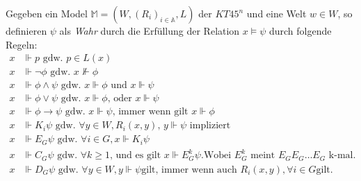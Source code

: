 \begin{definition}
		Gegeben ein Model $\mathds{M} = (W,(R_i)_{i \in \mathds{A}}, L)$ der $KT45^n$ und eine Welt $w \in W$, so definieren $\psi$ als \emph{Wahr} durch die Erfüllung der Relation $x \vDash \psi$ durch folgende Regeln:
		\begin{align}
			x &\Vdash p\text{ gdw. }p \in L(x)\\
			x &\Vdash \neg \phi\text{ gdw. }x \nVdash \phi\\
			x &\Vdash \phi \wedge \psi\text{ gdw. }x \Vdash \phi\text{ und } x \Vdash \psi\\
			x &\Vdash \phi \vee \psi\text{ gdw. }x \Vdash \phi \text{, oder } x \Vdash \psi\\
			x &\Vdash \phi \rightarrow \psi\text{ gdw. }x \Vdash \psi\text{, immer wenn gilt }x \Vdash \phi\\
			x &\Vdash K_i\psi \text{ gdw. } \forall y \in W, R_i(x,y) \text{, } y \Vdash \psi \text{ impliziert}\\
			x &\Vdash E_G\psi \text{ gdw. } \forall i \in G, x \Vdash K_i\psi\\
			x &\Vdash C_G\psi \text{ gdw. } \forall k \geq 1 \text{, und es gilt } x \Vdash E^k_G\psi \text{.} \text{Wobei } E^k_G \text{ meint } E_{G}E_{G}\dots E_{G} \text{ k-mal.}\\
			x &\Vdash D_G\psi \text{ gdw. } \forall y \in W, y \Vdash \psi \text{gilt, immer wenn auch } R_i(x,y), \forall i \in G \text{gilt.}\\
		\end{align}
\end{definition}
\cite[S.337]{huth2004logic}

